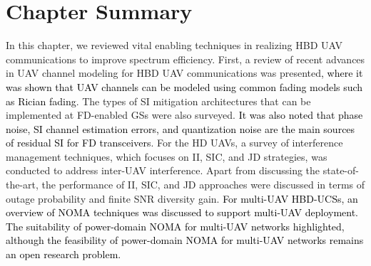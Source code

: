 \section{Chapter Summary} \label{lit_review_sec_conclusion}

In this chapter, we reviewed vital enabling techniques in realizing HBD UAV communications to improve spectrum efficiency. First, a review of recent advances in UAV channel modeling for HBD UAV communications was presented\textcolor{black}{, where it was shown that UAV channels can be modeled using common fading models such as Rician fading}. The types of SI mitigation architectures that can be implemented at FD-enabled GSs were also surveyed. \textcolor{black}{It was also noted that phase noise, SI channel estimation errors, and quantization noise are the main sources of residual SI for FD transceivers}. For the HD UAVs, a survey of interference management techniques, which focuses on II, SIC, and JD strategies, was conducted to address inter-UAV interference. Apart from discussing the state-of-the-art, the performance of II, SIC, and JD approaches were discussed in terms of outage probability and finite SNR diversity gain. \textcolor{black}{For multi-UAV HBD-UCSs, an overview of NOMA techniques was discussed to support multi-UAV deployment. The suitability of power-domain NOMA for multi-UAV networks highlighted, although the feasibility of power-domain NOMA for multi-UAV networks remains an open research problem.}




